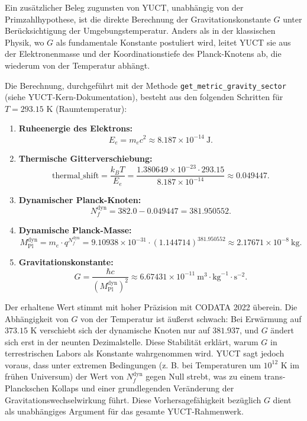 \documentclass[11pt,a4paper]{article}
\begin{document}
	Ein zusätzlicher Beleg zugunsten von YUCT, unabhängig von der Primzahlhypothese, ist die direkte Berechnung der Gravitationskonstante $G$ unter Berücksichtigung der Umgebungstemperatur. Anders als in der klassischen Physik, wo $G$ als fundamentale Konstante postuliert wird, leitet YUCT sie aus der Elektronenmasse und der Koordinationstiefe des Planck-Knotens ab, die wiederum von der Temperatur abhängt.
	
	Die Berechnung, durchgeführt mit der Methode \texttt{get\_metric\_gravity\_sector} (siehe YUCT-Kern-Dokumentation), besteht aus den folgenden Schritten für $T = 293.15$ K (Raumtemperatur):
	
	\begin{enumerate}
		\item \textbf{Ruheenergie des Elektrons:}
		\begin{equation}
			E_e = m_e c^2 \approx 8.187 \times 10^{-14}~\text{J}.
		\end{equation}
		\item \textbf{Thermische Gitterverschiebung:}
		\begin{equation}
			\text{thermal\_shift} = \frac{k_B T}{E_e} = \frac{1.380649 \times 10^{-23} \cdot 293.15}{8.187 \times 10^{-14}} \approx 0.049447.
		\end{equation}
		\item \textbf{Dynamischer Planck-Knoten:}
		\begin{equation}
			N_f^{\text{dyn}} = 382.0 - 0.049447 = 381.950552.
		\end{equation}
		\item \textbf{Dynamische Planck-Masse:}
		\begin{equation}
			M_{\text{Pl}}^{\text{dyn}} = m_e \cdot q^{N_f^{\text{dyn}}} = 9.10938 \times 10^{-31} \cdot (1.144714)^{381.950552} \approx 2.17671 \times 10^{-8}~\text{kg}.
		\end{equation}
		\item \textbf{Gravitationskonstante:}
		\begin{equation}
			G = \frac{\hbar c}{(M_{\text{Pl}}^{\text{dyn}})^2} \approx 6.67431 \times 10^{-11}~\text{m}^3\!\cdot\!\text{kg}^{-1}\!\cdot\!\text{s}^{-2}.
		\end{equation}
	\end{enumerate}
	
	Der erhaltene Wert stimmt mit hoher Präzision mit CODATA 2022 überein. Die Abhängigkeit von $G$ von der Temperatur ist äußerst schwach: Bei Erwärmung auf $373.15$ K verschiebt sich der dynamische Knoten nur auf $381.937$, und $G$ ändert sich erst in der neunten Dezimalstelle. Diese Stabilität erklärt, warum $G$ in terrestrischen Labors als Konstante wahrgenommen wird. YUCT sagt jedoch voraus, dass unter extremen Bedingungen (z. B. bei Temperaturen um $10^{12}$ K im frühen Universum) der Wert von $N_f^{\text{dyn}}$ gegen Null strebt, was zu einem trans-Planckschen Kollaps und einer grundlegenden Veränderung der Gravitationswechselwirkung führt. Diese Vorhersagefähigkeit bezüglich $G$ dient als unabhängiges Argument für das gesamte YUCT-Rahmenwerk.
	
\end{document}
